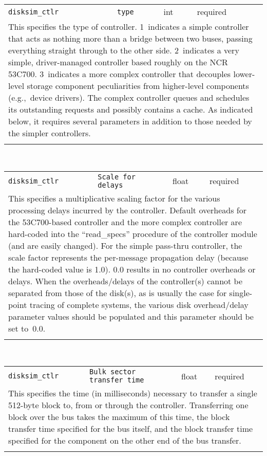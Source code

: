 \noindent 
\begin{tabular}{|p{\lpmodwidth}|p{\lpnamewidth}|p{0.5in}|p{0.5in}|}
\cline{1-4}
\texttt{disksim\_ctlr} & \texttt{type} & int & required \\ 
\cline{1-4}
\multicolumn{4}{|p{6in}|}{
This specifies the type of controller. 1~indicates a simple
controller that acts as nothing more than a bridge between two buses,
passing everything straight through to the other side. 2~indicates a
very simple, driver-managed controller based roughly on the NCR
53C700. 3~indicates a more complex controller that decouples
lower-level storage component peculiarities from higher-level
components (e.g.,~device drivers). The complex controller queues and
schedules its outstanding requests and possibly contains a cache. As
indicated below, it requires several parameters in addition to those
needed by the simpler controllers.
}\\ 
\cline{1-4}
\multicolumn{4}{p{5in}}{}\\
\end{tabular}\\ 
\noindent 
\begin{tabular}{|p{\lpmodwidth}|p{\lpnamewidth}|p{0.5in}|p{0.5in}|}
\cline{1-4}
\texttt{disksim\_ctlr} & \texttt{Scale for delays} & float & required \\ 
\cline{1-4}
\multicolumn{4}{|p{6in}|}{
This specifies a multiplicative scaling factor for the various
processing delays incurred by the controller. Default overheads for
the 53C700-based controller and the more complex controller are
hard-coded into the ``read\_specs'' procedure of the controller module
(and are easily changed). For the simple pass-thru controller, the
scale factor represents the per-message propagation delay (because the
hard-coded value is 1.0). 0.0 results in no controller overheads or
delays. When the overheads/delays of the controller(s) cannot be
separated from those of the disk(s), as is usually the case for
single-point tracing of complete systems, the various disk
overhead/delay parameter values should be populated and this parameter
should be set to~0.0.
}\\ 
\cline{1-4}
\multicolumn{4}{p{5in}}{}\\
\end{tabular}\\ 
\noindent 
\begin{tabular}{|p{\lpmodwidth}|p{\lpnamewidth}|p{0.5in}|p{0.5in}|}
\cline{1-4}
\texttt{disksim\_ctlr} & \texttt{Bulk sector transfer time} & float & required \\ 
\cline{1-4}
\multicolumn{4}{|p{6in}|}{
This specifies the time (in milliseconds) necessary to transfer a
single 512-byte block to, from or through the controller.
Transferring one block over the bus takes the maximum of this time,
the block transfer time specified for the bus itself, and the block
transfer time specified for the component on the other end of the bus
transfer.
}\\ 
\cline{1-4}
\multicolumn{4}{p{5in}}{}\\
\end{tabular}\\ 
